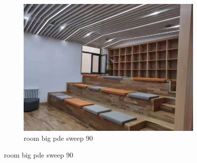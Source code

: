 \documentclass[11pt]{article}
\begin{document}
\begin{figure}[ht!]
\begin{subfigure}[]{0.333\linewidth}
        \centering
        \includegraphics[width=\linewidth]{fig/restoration/room_big/pde_90.jpg}
        \caption{room big pde sweep 90}
    \end{subfigure}%
\end{figure}
\end{document}
